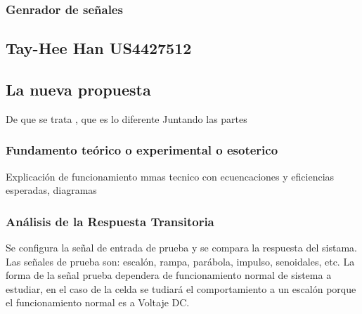 \documentclass[12pt,twoside,onecolumn]{article}
\begin{document}
\subsubsection{Genrador de señales}

\subsection{Tay-Hee Han US4427512~\cite{han1984water}}









\subsection{La nueva propuesta}

De que se trata , que es lo diferente
Juntando las partes

\subsubsection{Fundamento teórico o experimental o esoterico}
Explicación de funcionamiento
mmas tecnico con ecuencaciones y eficiencias esperadas, diagramas

\subsubsection{Análisis de la Respuesta Transitoria}
Se configura la señal de entrada de prueba y se compara la respuesta del sistama. Las señales de prueba son: escalón, rampa, parábola, impulso, senoidales, etc.  La forma de la señal prueba dependera de funcionamiento normal de sistema a estudiar, en el caso de la celda se tudiará el comportamiento a un escalón porque  el funcionamiento normal es a Voltaje DC. 
\end{document}
